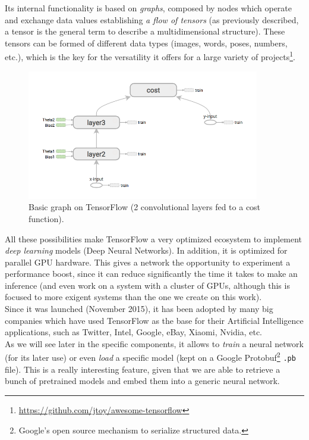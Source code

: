 	Its internal functionality is based on \emph{graphs}, composed by nodes which operate and exchange data values establishing \emph{a flow of tensors} (as previously described, a tensor is the general term to describe a multidimensional structure). These tensors can be formed of different data types (images, words, poses, numbers, etc.), which is the key for the versatility it offers for a large variety of projects\footnote{\url{https://github.com/jtoy/awesome-tensorflow}}.\\
	
	\begin{figure}[h]
		\centering
		\includegraphics[width=4in]{images/tf_graph}
		\caption{Basic graph on TensorFlow (2 convolutional layers fed to a cost function).}
		\label{fig:3_tf_graph}
	\end{figure}
	
	All these possibilities make TensorFlow a very optimized ecosystem to implement \emph{deep learning} models (Deep Neural Networks). In addition, it is optimized for parallel GPU hardware. This gives a network the opportunity to experiment a performance boost, since it can reduce significantly the time it takes to make an inference (and even work on a system with a cluster of GPUs, although this is focused to more exigent systems than the one we create on this work).\\
	
	Since it was launched (November 2015), it has been adopted by many big companies which have used TensorFlow as the base for their Artificial Intelligence applications, such as Twitter, Intel, Google, eBay, Xiaomi, Nvidia, etc.\\
	
	As we will see later in the specific components, it allows to \emph{train} a neural network (for its later use) or even \emph{load} a specific model (kept on a Google Protobuf\footnote{Google's open source mechanism to serialize structured data.} \texttt{.pb} file). This is a really interesting feature, given that we are able to retrieve a bunch of pretrained models and embed them into a generic neural network.

